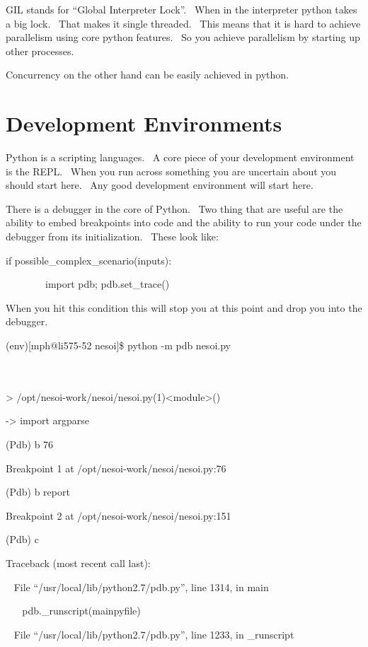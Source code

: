 \documentclass[]{article}
\begin{document}
GIL stands for ``Global Interpreter Lock''. ~When in the interpreter
python takes a big lock. ~That makes it single threaded. ~This means
that it is hard to achieve parallelism using core python features. ~So
you achieve parallelism by starting up other processes.

Concurrency on the other hand can be easily achieved in python.

\section{Development Environments}

Python is a scripting languages. ~A core piece of your development
environment is the REPL. ~When you run across something you are
uncertain about you should start here. ~Any good development environment
will start here.

There is a debugger in the core of Python. ~Two thing that are useful
are the ability to embed breakpoints into code and the ability to run
your code under the debugger from its initialization. ~These look like:

if possible\_complex\_scenario(inputs):

~~~~~~~~import pdb; pdb.set\_trace()

When you hit this condition this will stop you at this point and drop
you into the debugger.

(env){[}mph@li575-52 nesoi{]}\$ python -m pdb nesoi.py ~ ~ ~ ~ ~ ~ ~ ~ ~
~ ~ ~ ~ ~ ~ ~ ~ ~ ~ ~ ~ ~ ~ ~ ~ ~ ~ ~ ~ ~ ~ ~ ~ ~ ~ ~ ~ ~ ~ ~ ~ ~ ~ ~ ~
~ ~ ~ ~ ~ ~ ~ ~ ~ ~ ~ ~ ~ ~ ~ ~ ~ ~ ~ ~ ~ ~ ~ ~ ~ ~ ~ ~ ~ ~ ~ ~ ~ ~

\textgreater{}
/opt/nesoi-work/nesoi/nesoi.py(1)\textless{}module\textgreater{}()

-\textgreater{} import argparse

(Pdb) b 76

Breakpoint 1 at /opt/nesoi-work/nesoi/nesoi.py:76

(Pdb) b report

Breakpoint 2 at /opt/nesoi-work/nesoi/nesoi.py:151

(Pdb) c

Traceback (most recent call last):

~ File ``/usr/local/lib/python2.7/pdb.py'', line 1314, in main

~ ~ pdb.\_runscript(mainpyfile)

~ File ``/usr/local/lib/python2.7/pdb.py'', line 1233, in \_runscript
\end{document}
